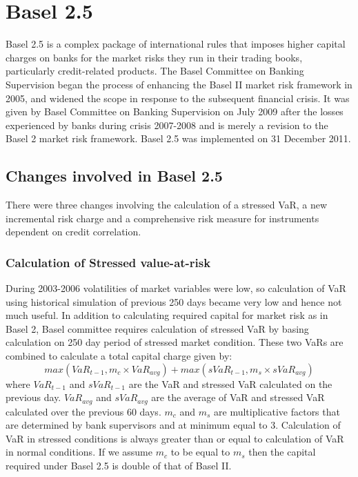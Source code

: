 \documentclass[11pt]{article}
\numberwithin{equation}{section}
\begin{document}
\pagebreak

\section{Basel 2.5}
\medskip
Basel 2.5 is a complex package of international rules that imposes higher capital charges on banks for the market risks they run in their trading books, particularly credit-related products. The Basel Committee on Banking Supervision began the process of enhancing the Basel II market risk framework in 2005, and widened the scope in response to the subsequent financial crisis. It was given by Basel Committee on Banking Supervision on July 2009 after the losses experienced by banks during crisis 2007-2008 and is merely a revision to the Basel 2 market risk framework. Basel 2.5 was implemented on 31 December 2011.

\subsection{Changes involved in Basel 2.5}
\medskip

There were three changes involving the calculation of a stressed VaR, a new incremental risk charge and a comprehensive risk measure for instruments dependent on credit correlation.

\subsubsection{Calculation of Stressed value-at-risk}
\medskip
During 2003-2006 volatilities of market variables were low, so calculation of VaR using historical simulation of previous 250 days became very low and hence not much useful. In addition to calculating required capital for market risk as in Basel 2, Basel committee requires calculation of  stressed VaR by basing calculation on 250 day period of stressed market condition. These two VaRs are combined to calculate a total capital charge given by:
$$ max( VaR_{t-1},m_c \times VaR_{avg} )+ max( sVaR_{t-1},m_s \times sVaR_{avg} )$$
where $VaR_{t-1}$ and $sVaR_{t-1}$ are the VaR and stressed VaR  calculated on the previous day. $VaR_{avg}$ and $sVaR_{avg}$ are the average of VaR and stressed VaR calculated over the previous 60 days. $m_c$ and $m_s$ are multiplicative factors that are determined by bank supervisors and at minimum equal to 3. Calculation of VaR in stressed conditions is always greater than or equal to calculation of VaR in normal conditions. If we assume $m_c$ to be equal to $m_s$ then the capital required under Basel 2.5 is double of that of Basel II. 
\end{document}
